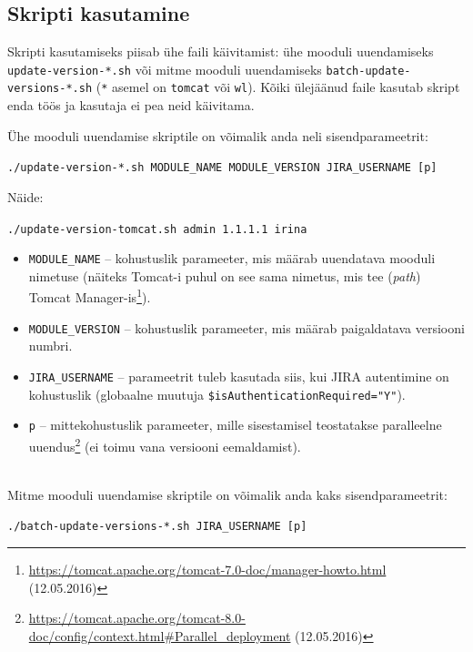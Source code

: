 \documentclass[12pt]{article}
\newcommand{\code}[1]{\texttt{#1}}
\begin{document}
  \newpage
  
  \subsection{Skripti kasutamine} 
   
  Skripti kasutamiseks piisab ühe faili käivitamist: ühe mooduli uuendamiseks \code{update-version-*.sh} või mitme mooduli uuendamiseks \code{batch-update-}\\
  \code{versions-*.sh} (\code{*} asemel on \code{tomcat} või \code{wl}). Kõiki ülejäänud faile kasutab skript enda töös ja kasutaja ei pea neid käivitama.
  
  Ühe mooduli uuendamise skriptile on võimalik anda neli sisendparameetrit:
  \begin{center}
    \small{\code{./update-version-*.sh MODULE\_NAME MODULE\_VERSION JIRA\_USERNAME [p]}}
  \end{center}
  
  Näide:
  \begin{center}
    \small{\code{./update-version-tomcat.sh admin 1.1.1.1 irina}}
  \end{center}

  \begin{itemize}
    \item \code{MODULE\_NAME} \--- kohustuslik parameeter, mis määrab uuendatava mooduli nimetuse (näiteks Tomcat-i puhul on see sama nimetus, mis tee (\textit{path}) Tomcat Manager-is\footnote{\url{https://tomcat.apache.org/tomcat-7.0-doc/manager-howto.html} (12.05.2016)}).
    \item \code{MODULE\_VERSION} \--- kohustuslik parameeter, mis määrab paigaldatava versiooni numbri.
    \item \code{JIRA\_USERNAME} \--- parameetrit tuleb kasutada siis, kui JIRA autentimine on kohustuslik (globaalne muutuja \code{\$isAuthenticationRequired="Y"}).
    \item \code{p} \--- mittekohustuslik parameeter, mille sisestamisel teostatakse paralleelne uuendus\footnote{\url{https://tomcat.apache.org/tomcat-8.0-doc/config/context.html\#Parallel\_deployment} (12.05.2016)} (ei toimu vana versiooni eemaldamist).
  \end{itemize}\\
  
  Mitme mooduli uuendamise skriptile on võimalik anda kaks sisendparameetrit:
  
  \begin{center}
    \small{\code{./batch-update-versions-*.sh JIRA\_USERNAME [p]}}
  \end{center}
  
\end{document}
